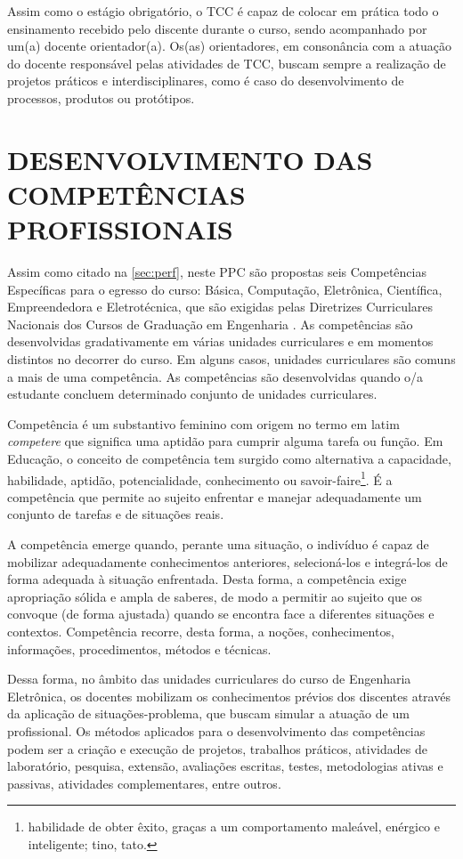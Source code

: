 Assim como o estágio obrigatório, o TCC é capaz de colocar em prática todo o ensinamento recebido pelo discente durante o curso, sendo acompanhado por um(a) docente orientador(a). Os(as) orientadores, em consonância com a atuação do docente responsável pelas atividades de TCC, buscam sempre a realização de projetos práticos e interdisciplinares, como é caso do desenvolvimento de processos, produtos ou protótipos.

\section{DESENVOLVIMENTO DAS COMPETÊNCIAS PROFISSIONAIS}
\label{sec:comp}

Assim como citado na \autoref{sec:perf}, neste PPC são propostas seis Competências Específicas para o egresso do curso: Básica, Computação, Eletrônica, Científica, Empreendedora e Eletrotécnica, que são exigidas pelas Diretrizes Curriculares Nacionais dos Cursos de Graduação em Engenharia \cite{dcneng}. As competências são desenvolvidas gradativamente em várias unidades curriculares e em momentos distintos no decorrer do curso. Em alguns casos, unidades curriculares são comuns a mais de uma competência. As competências são desenvolvidas quando o/a estudante concluem determinado conjunto de unidades curriculares.

Competência é um substantivo feminino com origem no termo em latim \textit{competere} que significa uma aptidão para cumprir alguma tarefa ou função. Em Educação, o conceito de competência tem surgido como alternativa a capacidade, habilidade, aptidão, potencialidade, conhecimento ou savoir-faire\footnote{habilidade de obter êxito, graças a um comportamento maleável, enérgico e inteligente; tino, tato.}. É a competência que permite ao sujeito  enfrentar e manejar adequadamente um conjunto de tarefas e de situações reais.

A competência emerge quando, perante uma situação, o indivíduo é capaz de mobilizar adequadamente conhecimentos anteriores, selecioná-los e integrá-los de forma adequada à situação enfrentada. Desta forma, a competência exige apropriação sólida e ampla de saberes, de modo a permitir ao sujeito que os convoque (de forma ajustada) quando se encontra face a diferentes situações e contextos. Competência recorre, desta forma, a noções, conhecimentos, informações, procedimentos, métodos e técnicas.

Dessa forma, no âmbito das unidades curriculares do curso de Engenharia Eletrônica, os docentes mobilizam os conhecimentos prévios dos discentes através da aplicação de situações-problema, que buscam simular a atuação de um profissional. Os métodos aplicados para o desenvolvimento das competências podem ser a criação e execução de projetos, trabalhos práticos, atividades de laboratório, pesquisa, extensão, avaliações escritas, testes, metodologias ativas e passivas, atividades complementares, entre outros. 

